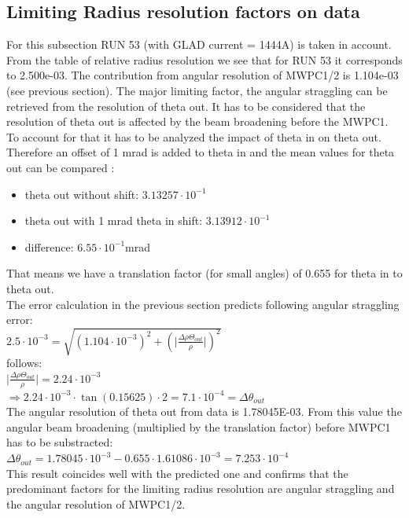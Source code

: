 \documentclass[12pt, letterpaper]{article}
\begin{document}
\subsection{Limiting Radius resolution factors on data}
For this subsection RUN 53 (with GLAD current = 1444A) is taken in account.\\
From the table of relative radius resolution we see that for RUN 53 it corresponds to 2.500e-03. The contribution from angular resolution of MWPC1/2 is 1.104e-03 (see previous section). The major limiting factor, the angular straggling can be retrieved from the resolution of theta \textunderscore out. It has to be considered that the resolution of theta \textunderscore out is affected by the beam broadening before the MWPC1. To account for that it has to be analyzed the impact of theta \textunderscore in on theta \textunderscore out. \\
Therefore an offset of 1 mrad is added to  theta \textunderscore in and the mean values for theta \textunderscore out can be compared :\\
\begin{itemize}
\item theta \textunderscore out without shift: $3.13257\cdot10^{-1}$
\item theta \textunderscore out with 1 mrad theta \textunderscore in shift: $3.13912\cdot10^{-1}$
\item difference: $6.55\cdot10^{-1}$mrad
\end{itemize}
That means we have a translation factor (for small angles) of 0.655 for theta \textunderscore in to theta \textunderscore out.\\
The error calculation in the previous section predicts following angular straggling error:\\
$2.5\cdot10^{-3} = \sqrt{(1.104\cdot10^{-3})^{2}+(\Big|\frac{\Delta\rho{\Theta_{out}}}{\rho}\Big|)^{2}}$ \\
follows:\\
$\Big|\frac{\Delta\rho{\Theta_{out}}}{\rho}\Big| = 2.24\cdot10^{-3}$\\
$\Longrightarrow 2.24\cdot10^{-3} \cdot \tan(0.15625) \cdot 2 = 7.1 \cdot 10^{-4} =  \Delta\theta_{out}$ \\
The angular resolution of theta \textunderscore out from data is 1.78045E-03. From this value the angular beam broadening (multiplied by the translation factor) before MWPC1 has to be substracted:\\
$\Delta\theta_{out} = 1.78045\cdot10^{-3} -0.655 \cdot 1.61086\cdot 10^{-3} = 7.253 \cdot 10^{-4} $\\
This result coincides well with the predicted one and confirms that the predominant factors for the limiting radius resolution are angular straggling and the angular resolution of MWPC1/2.
\end{document}
